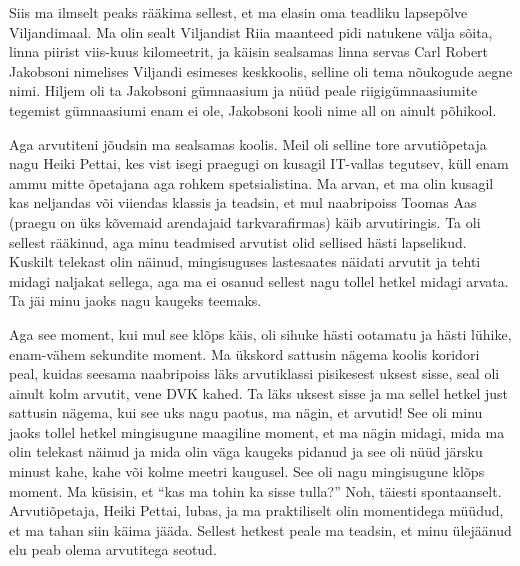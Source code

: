 

Siis ma ilmselt peaks rääkima sellest, et ma  elasin oma teadliku lapsepõlve 
Viljandimaal. Ma olin sealt Viljandist Riia maanteed pidi natukene välja sõita, 
 linna piirist viis-kuus kilomeetrit, ja  käisin sealsamas linna servas Carl 
Robert Jakobsoni nimelises Viljandi esimeses keskkoolis, selline oli tema nõukogude aegne nimi. Hiljem oli ta Jakobsoni 
gümnaasium ja nüüd peale riigigümnaasiumite tegemist gümnaasiumi enam ei ole, 
Jakobsoni kooli nime all on ainult põhikool. 

Aga arvutiteni jõudsin ma sealsamas koolis. Meil oli selline tore arvutiõpetaja 
nagu Heiki Pettai, kes vist isegi praegugi on kusagil 
IT-vallas tegutsev, küll enam ammu mitte õpetajana aga rohkem  
spetsialistina. Ma arvan, et ma olin kusagil kas neljandas või viiendas 
klassis ja teadsin, et mul naabripoiss Toomas Aas (praegu on üks kõvemaid arendajaid tarkvarafirmas) käib 
 arvutiringis. Ta oli sellest 
rääkinud, aga minu teadmised arvutist olid sellised hästi  lapselikud. Kuskilt 
telekast olin näinud, mingisuguses lastesaates näidati arvutit ja 
tehti midagi naljakat sellega, aga ma ei osanud sellest nagu tollel hetkel 
midagi arvata. Ta jäi minu jaoks nagu kaugeks teemaks. 

Aga see moment, kui mul see klõps käis, oli sihuke hästi ootamatu ja hästi 
lühike, enam-vähem sekundite moment. Ma ükskord sattusin nägema koolis koridori 
peal, kuidas seesama naabripoiss läks  arvutiklassi  pisikesest uksest sisse, 
seal oli ainult kolm arvutit, vene DVK kahed. Ta läks 
 uksest sisse ja ma sellel hetkel just sattusin nägema, kui see uks nagu 
paotus, ma nägin, et arvutid! See oli minu jaoks tollel hetkel mingisugune 
maagiline moment, et ma nägin midagi, mida ma olin telekast näinud ja mida olin 
väga kaugeks pidanud ja see oli nüüd järsku minust kahe, kahe või kolme meetri 
kaugusel. See oli nagu mingisugune klõps moment. Ma küsisin, et \enquote{kas ma 
tohin ka sisse tulla?} Noh, täiesti spontaanselt. Arvutiõpetaja, Heiki Pettai,  
lubas, ja ma praktiliselt olin momentidega müüdud, et ma tahan siin käima 
jääda. Sellest hetkest peale ma teadsin, et minu ülejäänud elu peab olema 
arvutitega seotud. 



